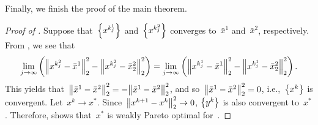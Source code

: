 \documentclass[../main]{subfiles}
\begin{document}
Finally, we finish the proof of the main theorem.
\begin{proof}[Proof of ]
    Suppose that~$\set*{x^{k^1_j}}$ and~$\set*{x^{k^2_j}}$ converges to~$\bar{x}^1$ and~$\bar{x}^2$, respectively.
    From , we see that
    \begin{equation}
        \lim_{j \to \infty} \left( \norm*{x^{k^2_j} - \bar{x}^1}_2^2 - \norm*{x^{k^2_j} - \bar{x}_2^2}_2^2 \right) = \lim_{j \to \infty} \left( \norm*{x^{k^1_j} - \bar{x}^1}_2^2 - \norm*{x^{k^1_j} - \bar{x}_2^2}_2^2 \right)
        .\end{equation}
    This yields that~$\norm*{\bar{x}^1 - \bar{x}^2}_2^2 = - \norm*{\bar{x}^1 - \bar{x}^2}_2^2$, and so~$\norm*{\bar{x}^1 - \bar{x}^2}_2^2 = 0$, i.e.,~$\set*{x^k}$ is convergent.
    Let~$x^k \to x^\ast$.
    Since~$\norm*{x^{k + 1} - x^k}_2^2 \to 0$, $\set*{y^k}$ is also convergent to~$x^\ast$.
    Therefore,  shows that~$x^\ast$ is weakly Pareto optimal for~.
\end{proof}
\end{document}

